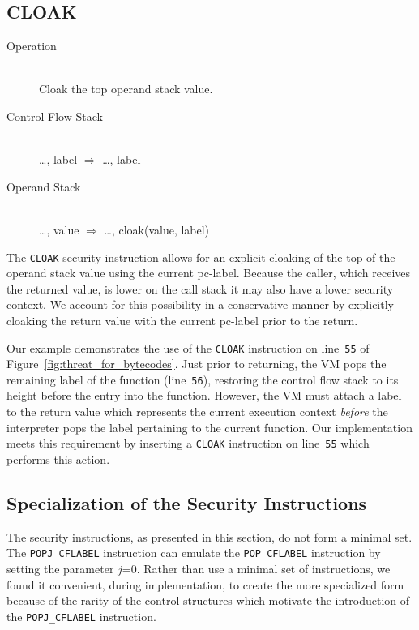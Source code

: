 \documentclass[preprint]{sigplanconf}
\begin{document}
\subsection{CLOAK}
\label{sec:cloak-bytecode}

\begin{description}
\item[Operation] \hfill \\
 Cloak the top operand stack value.
\item[Control Flow Stack] \hfill \\
 \ldots, label $\Rightarrow$ \ldots, label
\item[Operand Stack] \hfill \\
 \ldots, value $\Rightarrow$ \ldots, cloak(value, label)
\end{description}

The \texttt{CLOAK} security instruction allows for an explicit cloaking of the top of the operand stack value using the current pc-label.
Because the caller, which receives the returned value, is lower on the call stack it may also have a lower security context.
We account for this possibility in a conservative manner by explicitly cloaking the return value with the current pc-label prior to the return.

Our example demonstrates the use of the \texttt{CLOAK} instruction on line~\texttt{55} of Figure~\ref{fig:threat_for_bytecodes}.
Just prior to returning, the VM pops the remaining label of the function (line~\texttt{56}), restoring the control flow stack to its height before the entry into the function.
However, the VM must attach a label to the return value which represents the current execution context \emph{before} the interpreter pops the label pertaining to the current function.
Our implementation meets this requirement by inserting a \texttt{CLOAK} instruction on line~\texttt{55} which performs this action.

\subsection{Specialization of the Security Instructions}

The security instructions, as presented in this section, do not form a minimal set.
The \texttt{POPJ\_CFLABEL} instruction can emulate the \texttt{POP\_CFLABEL} instruction by setting the parameter $j$=0.
Rather than use a minimal set of instructions, we found it convenient, during implementation, to create the more specialized form because of the rarity of the control structures which motivate the introduction of the \texttt{POPJ\_CFLABEL} instruction.
\end{document}
